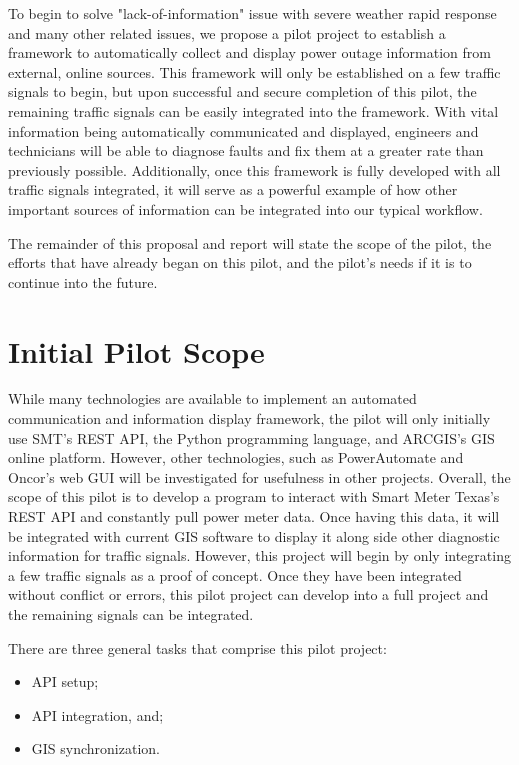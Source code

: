 \documentclass[letterpaper, notitlepage]{report}
\begin{document}
To begin to solve "lack-of-information" issue with severe weather rapid response and many other related issues, we propose a pilot project to establish a framework to automatically collect and display power outage information from external, online sources. This framework will only be established on a few traffic signals to begin, but upon successful and secure completion of this pilot, the remaining traffic signals can be easily integrated into the framework. With vital information being automatically communicated and displayed, engineers and technicians will be able to diagnose faults and fix them at a greater rate than previously possible. Additionally, once this framework is fully developed with all traffic signals integrated, it will serve as a powerful example of how other important sources of information can be integrated into our typical workflow.

The remainder of this proposal and report will state the scope of the pilot, the efforts that have already began on this pilot, and the pilot's needs if it is to continue into the future.

\section{Initial Pilot Scope}
While many technologies are available to implement an automated communication and information display framework, the pilot will only initially use SMT's REST API, the Python programming language, and ARCGIS's GIS online platform. However, other technologies, such as PowerAutomate and Oncor's web GUI will be investigated for usefulness in other projects. Overall, the scope of this pilot is to develop a program to interact with Smart Meter Texas's REST API and constantly pull power meter data. Once having this data, it will be integrated with current GIS software to display it along side other diagnostic information for traffic signals. However, this project will begin by only integrating a few traffic signals as a proof of concept. Once they have been integrated without conflict or errors, this pilot project can develop into a full project and the remaining signals can be integrated.

There are three general tasks that comprise this pilot project: 
\begin{itemize}
    \item API setup;
    \item API integration, and;
    \item GIS synchronization.
\end{itemize}
\end{document}
